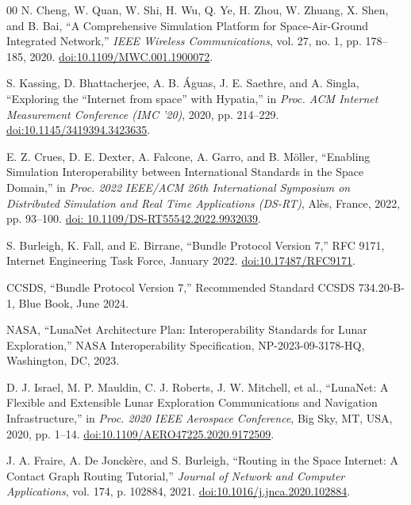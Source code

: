 \documentclass[a4paper,fleqn]{cas-sc}
\begin{document}
\begin{thebibliography}{00}
 N. Cheng, W. Quan, W. Shi, H. Wu, Q. Ye, H. Zhou, W. Zhuang, X. Shen, and B. Bai, ``A Comprehensive Simulation Platform for Space-Air-Ground Integrated Network,'' \textit{IEEE Wireless Communications}, vol. 27, no. 1, pp. 178--185, 2020. \href{https://doi.org/10.1109/MWC.001.1900072}{doi:10.1109/MWC.001.1900072}.

 S. Kassing, D. Bhattacherjee, A. B. \'Aguas, J. E. Saethre, and A. Singla, ``Exploring the ``Internet from space'' with Hypatia,'' in \textit{Proc. ACM Internet Measurement Conference (IMC '20)}, 2020, pp. 214--229. \href{https://doi.org/10.1145/3419394.3423635}{doi:10.1145/3419394.3423635}.

 E. Z. Crues, D. E. Dexter, A. Falcone, A. Garro, and B. M\"oller, ``Enabling Simulation Interoperability between International Standards in the Space Domain,'' in \textit{Proc. 2022 IEEE/ACM 26th International Symposium on Distributed Simulation and Real Time Applications (DS-RT)}, Al\`es, France, 2022, pp. 93--100. \href{https://doi.org/10.1109/DS-RT55542.2022.9932039}{doi: 10.1109/DS-RT55542.2022.9932039}.

 S. Burleigh, K. Fall, and E. Birrane, ``Bundle Protocol Version 7,'' RFC 9171, Internet Engineering Task Force, January 2022. \href{https://doi.org/10.17487/RFC9171}{doi:10.17487/RFC9171}.

 CCSDS, ``Bundle Protocol Version 7,'' Recommended Standard CCSDS 734.20-B-1, Blue Book, June 2024.

 NASA, ``LunaNet Architecture Plan: Interoperability Standards for Lunar Exploration,'' NASA Interoperability Specification, NP-2023-09-3178-HQ, Washington, DC, 2023.

 D. J. Israel, M. P. Mauldin, C. J. Roberts, J. W. Mitchell, et al., ``LunaNet: A Flexible and Extensible Lunar Exploration Communications and Navigation Infrastructure,'' in \textit{Proc. 2020 IEEE Aerospace Conference}, Big Sky, MT, USA, 2020, pp. 1--14. \href{https://doi.org/10.1109/AERO47225.2020.9172509}{doi:10.1109/AERO47225.2020.9172509}.

 J. A. Fraire, A. De Jonck\`ere, and S. Burleigh, ``Routing in the Space Internet: A Contact Graph Routing Tutorial,'' \textit{Journal of Network and Computer Applications}, vol. 174, p. 102884, 2021. \href{https://doi.org/10.1016/j.jnca.2020.102884}{doi:10.1016/j.jnca.2020.102884}.


\end{thebibliography}
\end{document}
